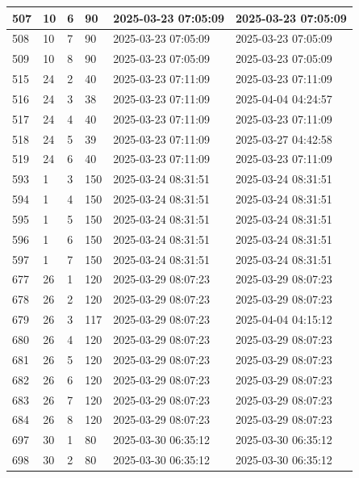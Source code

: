 \begin{longtable}{|l|l|l|l|l|l|}
507 & 10 & 6 & 90 & 2025-03-23 07:05:09 & 2025-03-23 07:05:09 \\ \hline 
508 & 10 & 7 & 90 & 2025-03-23 07:05:09 & 2025-03-23 07:05:09 \\ \hline 
509 & 10 & 8 & 90 & 2025-03-23 07:05:09 & 2025-03-23 07:05:09 \\ \hline 
515 & 24 & 2 & 40 & 2025-03-23 07:11:09 & 2025-03-23 07:11:09 \\ \hline 
516 & 24 & 3 & 38 & 2025-03-23 07:11:09 & 2025-04-04 04:24:57 \\ \hline 
517 & 24 & 4 & 40 & 2025-03-23 07:11:09 & 2025-03-23 07:11:09 \\ \hline 
518 & 24 & 5 & 39 & 2025-03-23 07:11:09 & 2025-03-27 04:42:58 \\ \hline 
519 & 24 & 6 & 40 & 2025-03-23 07:11:09 & 2025-03-23 07:11:09 \\ \hline 
593 & 1 & 3 & 150 & 2025-03-24 08:31:51 & 2025-03-24 08:31:51 \\ \hline 
594 & 1 & 4 & 150 & 2025-03-24 08:31:51 & 2025-03-24 08:31:51 \\ \hline 
595 & 1 & 5 & 150 & 2025-03-24 08:31:51 & 2025-03-24 08:31:51 \\ \hline 
596 & 1 & 6 & 150 & 2025-03-24 08:31:51 & 2025-03-24 08:31:51 \\ \hline 
597 & 1 & 7 & 150 & 2025-03-24 08:31:51 & 2025-03-24 08:31:51 \\ \hline 
677 & 26 & 1 & 120 & 2025-03-29 08:07:23 & 2025-03-29 08:07:23 \\ \hline 
678 & 26 & 2 & 120 & 2025-03-29 08:07:23 & 2025-03-29 08:07:23 \\ \hline 
679 & 26 & 3 & 117 & 2025-03-29 08:07:23 & 2025-04-04 04:15:12 \\ \hline 
680 & 26 & 4 & 120 & 2025-03-29 08:07:23 & 2025-03-29 08:07:23 \\ \hline 
681 & 26 & 5 & 120 & 2025-03-29 08:07:23 & 2025-03-29 08:07:23 \\ \hline 
682 & 26 & 6 & 120 & 2025-03-29 08:07:23 & 2025-03-29 08:07:23 \\ \hline 
683 & 26 & 7 & 120 & 2025-03-29 08:07:23 & 2025-03-29 08:07:23 \\ \hline 
684 & 26 & 8 & 120 & 2025-03-29 08:07:23 & 2025-03-29 08:07:23 \\ \hline 
697 & 30 & 1 & 80 & 2025-03-30 06:35:12 & 2025-03-30 06:35:12 \\ \hline 
698 & 30 & 2 & 80 & 2025-03-30 06:35:12 & 2025-03-30 06:35:12 \\ \hline 

\end{longtable}
